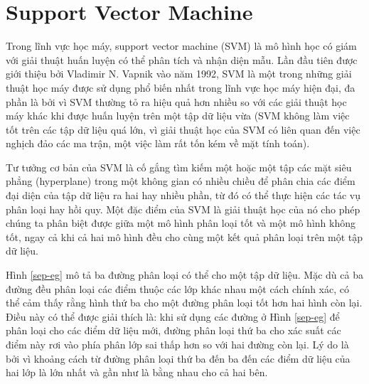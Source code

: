 \section{Support Vector Machine}
Trong lĩnh vực học máy, support vector machine (SVM) là mô hình học có giám với giải thuật huấn luyện có thể phân tích và nhận diện mẫu. Lần đầu tiên được giới thiệu bởi Vladimir N. Vapnik vào năm 1992, SVM là một trong những giải thuật học máy được sử dụng phổ biến nhất trong lĩnh vực học máy hiện đại, đa phần là bởi vì SVM thường tỏ ra hiệu quả hơn nhiều so với các giải thuật học máy khác khi được huấn luyện trên một tập dữ liệu vừa (SVM không làm việc tốt trên các tập dữ liệu quá lớn, vì giải thuật học của SVM có liên quan đến việc nghịch đảo các ma trận, một việc làm rất tốn kém về mặt tính toán). 

Tư tưởng cơ bản của SVM là cố gắng tìm kiếm một hoặc một tập các mặt siêu phẳng (hyperplane) trong một không gian có nhiều chiều để phân chia các điểm đại diện của tập dữ liệu ra hai hay nhiều phần, từ đó có thể thực hiện các tác vụ phân loại hay hồi quy. Một đặc điểm của SVM là giải thuật học của nó cho phép chúng ta phân biệt được giữa một mô hình phân loại tốt và một mô hình không tốt, ngay cả khi cả hai mô hình đều cho cùng một kết quả phân loại trên một tập dữ liệu.

Hình \ref{sep-eg} mô tả ba đường phân loại có thể cho một tập dữ liệu. Mặc dù cả ba đường đều phân loại các điểm thuộc các lớp khác nhau một cách chính xác, có thể cảm thấy rằng hình thứ ba cho một đường phân loại tốt hơn hai hình còn lại. Điều này có thể được giải thích là: khi sử dụng các đường ở Hình \ref{sep-eg} để phân loại cho các điểm dữ liệu mới, đường phân loại thứ ba cho xác suất các điểm này rơi vào phía phân lớp sai thấp hơn so với hai đường còn lại. Lý do là bởi vì khoảng cách từ đường phân loại thứ ba đến ba đến các điểm dữ liệu của hai lớp là lớn nhất và gần như là bằng nhau cho cả hai bên.

